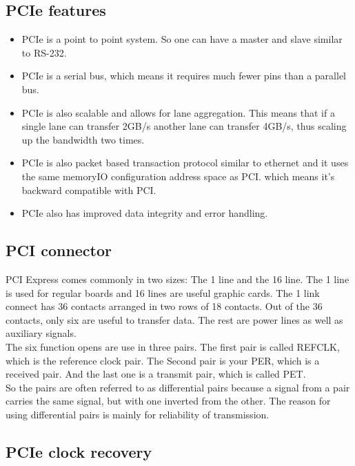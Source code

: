 \subsection{PCIe features}

\begin{itemize}
	\item PCIe is a point to point system. So one can have a master and slave similar to RS-232.
    \item PCIe is a serial bus, which means it requires much fewer pins than a parallel bus.
    \item PCIe is also scalable and allows for lane aggregation. This means that if a single lane can transfer 2GB/s another lane can transfer 4GB/s, thus scaling up the bandwidth two times. 
    \item PCIe is also packet based transaction protocol similar to ethernet and it uses the same memoryIO configuration address space as PCI. which means it's backward compatible with PCI.
    \item PCIe also has improved data integrity and error handling.
\end{itemize}


\subsection{PCI connector}

PCI Express comes commonly in two sizes: The 1 line and the 16 line. The 1 line is used for regular boards and 16 lines are useful graphic cards. The 1 link connect has 36 contacts arranged in two rows of 18 contacts. Out of the 36 contacts, only six are useful to transfer data. The rest are power lines as well as auxiliary signals.\\
The six function opens are use in three pairs. The first pair is called REFCLK, which is the reference clock pair. The Second pair is your PER, which is a received pair. And the last one is a transmit pair, which is called PET.\\
So the pairs are often referred to as differential pairs because a signal from a pair carries the same signal, but with one inverted from the other. The reason for using differential pairs is mainly for reliability of transmission.


\subsection{PCIe clock recovery}

